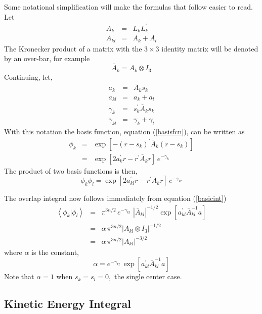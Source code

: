 \documentclass[12pt,thmsa]{article}
\begin{document}
Some notational simplification will make the formulas that follow easier to
read. Let 
\begin{eqnarray*}
A_k &=&L_kL_k^{\prime } \\
A_{kl} &=&A_k+A_l
\end{eqnarray*}
The Kronecker product of a matrix with the $3\times 3$ identity matrix will
be denoted by an over-bar, for example 
\[
\bar{A}_k=A_k\otimes I_3
\]
Continuing, let, 
\begin{eqnarray*}
a_k &=&\bar{A}_ks_k \\
a_{kl} &=&a_k+a_l \\
\gamma _k &=&s_k^{\prime }\bar{A}_ks_k \\
\gamma _{kl} &=&\gamma _k+\gamma _l
\end{eqnarray*}
With this notation the basis function, equation (\ref{basisfcn}), can be
written as 
\begin{eqnarray}
\phi _k &=&\exp \left[ -\left( r-s_k\right) ^{\prime }\bar{A}_k\left(
r-s_k\right) \right]   \nonumber \\
&=&\exp \left[ 2a_k^{\prime }r-r^{\prime }\bar{A}_kr\right] \,e^{-\gamma _k}
\end{eqnarray}
The product of two basis functions is then, 
\begin{equation}
\phi _k\phi _l=\exp \left[ 2a_{kl}^{\prime }r-r^{\prime }\bar{A}_kr\right]
\,e^{-\gamma _{kl}}
\end{equation}

The overlap integral now follows immediately from equation (\ref{basicint}) 
\begin{eqnarray}
\left\langle \phi _k\right. |\left. \phi _l\right\rangle  &=&\pi
^{3n/2}\,e^{-\gamma _{kl}}\,\,\left| \bar{A}_{kl}\right| ^{-1/2}\exp \left[
a_{kl}^{\prime }\bar{A}_{kl}^{-1}a\right]   \nonumber \\
&=&\alpha \,\pi ^{3n/2}\left| A_{kl}\otimes I_3\right| ^{-1/2}  \nonumber \\
&=&\alpha \,\pi ^{3n/2}\left| A_{kl}\right| ^{-3/2}
\end{eqnarray}
where $\alpha $ is the constant, 
\begin{equation}
\alpha =e^{-\gamma _{kl}}\,\exp \left[ a_{kl}^{\prime }\bar{A}%
_{kl}^{-1}a\right] 
\end{equation}
Note that $\alpha =1$ when $s_k=s_l=0,$ the single center case.

\subsection{Kinetic Energy Integral}
\end{document}
